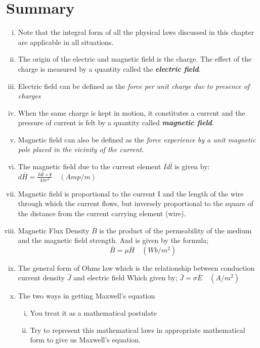 \section{Summary}
\begin{enumerate}[(i)]
\item Note that the integral form of all the physical laws discussed in this chapter are applicable in all situations.

\item The origin of the electric and magnetic field is the charge. The effect of the charge is measured by a quantity called the \textbf{\emph{electric field}}.

\item Electric field can be defined as the \emph{force per unit charge due to presence of charges} 

\item When the same charge is kept in motion, it constitutes a current and the pressure of current is felt by a quantity called \textbf{\emph{magnetic field}}.

\item Magnetic field can also be defined as the \emph{force experience by a unit magnetic pole placed in the vicinity of the current}.

\item The magnetic field due to the current element $Id\bar{l}$ is given by:
$\boxed{d\bar{H}= \frac{Id\bar{l} \times \hat{\textbf{r}}}{4\pi r^{2}}}\quad (Amp/m)$ 

\item Magnetic field is proportional to the current I and the length of the wire through which the current flows, but inversely proportional to the square of the distance from the current carrying element (wire).

\item Magnetic Flux Density $\bar{B}$ is the product of the permeability of the medium and the magnetic field strength. And is given by the formula;
$$\quad\boxed{\bar{B} = \mu\bar{H}}\quad (Wb/m^{2})$$

\item The general form of Ohms law which is the relationship between conduction current density $\bar{J}$ and electric field Which given by; $\boxed{\bar{J} = \sigma\bar{E}}\quad (A/m^{2})$

\item The two ways in getting Maxwell's equation 
\begin{enumerate}[(i)]
\item	You treat it as a mathematical postulate
\item	Try to represent this mathematical laws in appropriate mathematical form to give us Maxwell's equation.
\end{enumerate}


\end{enumerate}
